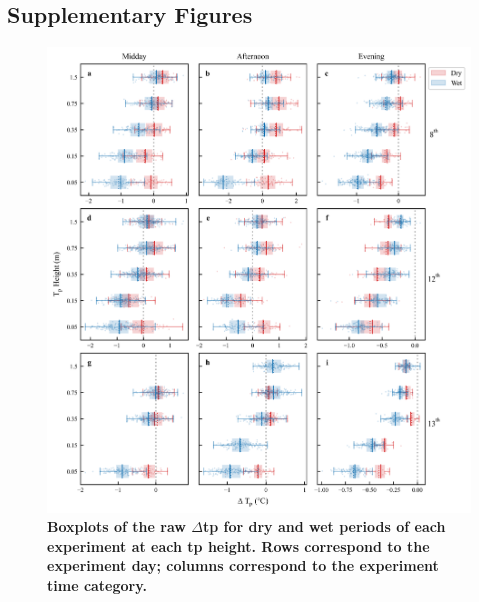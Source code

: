 \documentclass[final,3p,times,authoryear]{elsarticle}
\begin{document}
\subsection{Supplementary Figures}\label{sec:suppfig}

\begin{figure}
\centering
\includegraphics[trim={0 0 0 0},clip,scale=1.0]{pict038.png}
\caption{\bf Boxplots of the raw $\Delta$\gls{tp} for dry and wet periods of each experiment at each \gls{tp} height. Rows correspond to the experiment day; columns correspond to the experiment time category.}
 \label{fig:7.9}
\end{figure}

\end{document}

